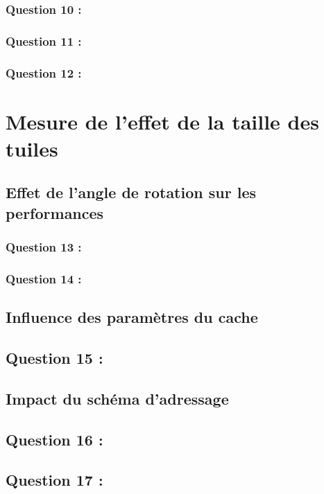 \documentclass[11pt,a4paper]{article}
\begin{document}
        \subsubsection{Question 10 :}
        
        \subsubsection{Question 11 :}
        
        \subsubsection{Question 12 :}
        
\section{ Mesure de l’effet de la taille des tuiles}
    \subsection{Effet de l’angle de rotation sur les performances}
        \subsubsection{Question 13 :}
        
        \subsubsection{Question 14 :}
        
\subsection{Influence des paramètres du cache}
    \subsection{Question 15 :}
        
\subsection{Impact du schéma d’adressage}
    \subsection{Question 16 :}
        
    \subsection{Question 17 :}
        
\end{document}
